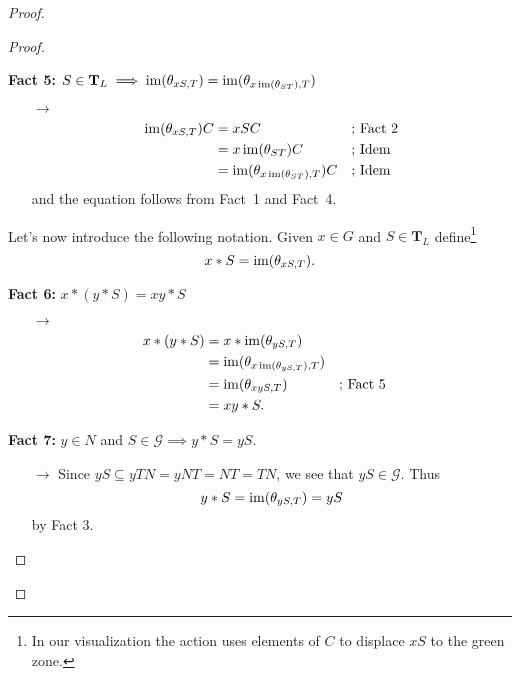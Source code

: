 \begin{solution}
\begin{proof}
\begin{proof}
\begin{enumerate}[\rm a)]
    \textbf{Fact 5:} $S\in\mathbf T_L\implies \operatorname{im}(\theta_{xS,T})=\operatorname{im}(\theta_{x\operatorname{im}(\theta_{ST}),T})$


    {\small
    \begin{enumerate}
        \item[$\to$]
        \begin{align*}
            \operatorname{im}(\theta_{xS,T})C &= xSC  &&\text{; Fact 2}\\
                &= x\operatorname{im}(\theta_{ST})C   &&\text{; Idem}\\
                &= \operatorname{im}(\theta_{x\operatorname{im}(\theta_{ST}),T})C   &&\text{; Idem}
        \end{align*}
        and the equation follows from Fact~1 and Fact~4.
    \end{enumerate}
    }

    \medskip
    
    Let's now introduce the following notation. Given $x\in G$ and $S\in\mathbf T_L$ define\footnote{In our visualization the action uses elements of $C$ to displace $xS$ to the green zone.}
    $$
        x\ast S = \operatorname{im}(\theta_{xS,T}).
    $$

    \medskip
    
    \textbf{Fact 6:} $x\ast(y\ast S) = xy\ast S$

    {\small
        \begin{enumerate}
        \item[$\to$]
        \begin{align*}
                x\ast(y\ast S) &= x\ast\operatorname{im}(\theta_{yS,T})\\
                    &= \operatorname{im}(\theta_{x\operatorname{im}(\theta_{yS,T}),T})\\
                    &= \operatorname{im}(\theta_{xyS,T})   &&\text{; Fact 5}\\
                    &= xy\ast S.
        \end{align*}
    \end{enumerate}
    }

    \textbf{Fact 7:} $y\in N$ and $S\in\mathcal G\implies y\ast S=yS$.

    {\small
    \begin{enumerate}
        \item[$\to$]
        Since $yS\subseteq yTN=yNT=NT=TN$, we see that $yS\in\mathcal G$. Thus
        $$
            y\ast S = \operatorname{im}(\theta_{yS,T}) = yS
        $$
        by Fact 3.
        \end{enumerate}
    }
    

\end{enumerate}
\end{proof}
\end{proof}
\end{solution}
